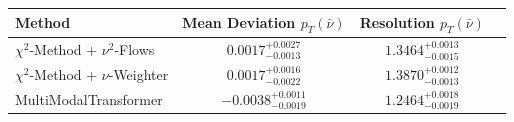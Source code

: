     \begin{tabular}{lccc}
        \toprule
        Method & Mean Deviation $p_{T}(\bar{\nu})$ & Resolution $p_{T}(\bar{\nu})$ \\
        \midrule
        $\chi^2$-Method + $\nu^2$-Flows & $0.0017^{+0.0027}_{-0.0013}$ & $1.3464^{+0.0013}_{-0.0015}$ \\
        $\chi^2$-Method + $\nu$-Weighter & $0.0017^{+0.0016}_{-0.0022}$ & $1.3870^{+0.0012}_{-0.0013}$ \\
        MultiModalTransformer & $-0.0038^{+0.0011}_{-0.0019}$ & $1.2464^{+0.0018}_{-0.0019}$ \\
        \bottomrule
    \end{tabular}